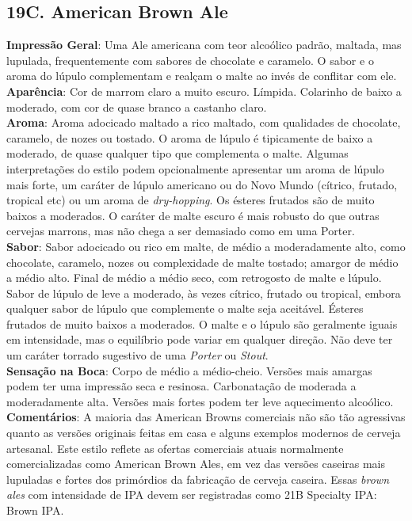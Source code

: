 \subsection*{19C. American Brown Ale}
\textbf{Impressão Geral}: Uma Ale americana com teor alcoólico padrão, maltada, mas lupulada, frequentemente com sabores de chocolate e caramelo. O sabor e o aroma do lúpulo complementam e realçam o malte ao invés de conflitar com ele. \\
\textbf{Aparência}: Cor de marrom claro a muito escuro. Límpida. Colarinho de baixo a moderado, com cor de quase branco a castanho claro. \\
\textbf{Aroma}: Aroma adocicado maltado a rico maltado, com qualidades de chocolate, caramelo, de nozes ou tostado. O aroma de lúpulo é tipicamente de baixo a moderado, de quase qualquer tipo que complementa o malte. Algumas interpretações do estilo podem opcionalmente apresentar um aroma de lúpulo mais forte, um caráter de lúpulo americano ou do Novo Mundo (cítrico, frutado, tropical etc) ou um aroma de \textit{dry-hopping}. Os ésteres frutados são de muito baixos a moderados. O caráter de malte escuro é mais robusto do que outras cervejas marrons, mas não chega a ser demasiado como em uma Porter. \\
\textbf{Sabor}: Sabor adocicado ou rico em malte, de médio a moderadamente alto, como chocolate, caramelo, nozes ou complexidade de malte tostado; amargor de médio a médio alto. Final de médio a médio seco, com retrogosto de malte e lúpulo. Sabor de lúpulo de leve a moderado, às vezes cítrico, frutado ou tropical, embora qualquer sabor de lúpulo que complemente o malte seja aceitável. Ésteres frutados de muito baixos a moderados. O malte e o lúpulo são geralmente iguais em intensidade, mas o equilíbrio pode variar em qualquer direção. Não deve ter um caráter torrado sugestivo de uma \textit{Porter} ou \textit{Stout}. \\
\textbf{Sensação na Boca}: Corpo de médio a médio-cheio. Versões mais amargas podem ter uma impressão seca e resinosa. Carbonatação de moderada a moderadamente alta. Versões mais fortes podem ter leve aquecimento alcoólico. \\
\textbf{Comentários}: A maioria das American Browns comerciais não são tão agressivas quanto as versões originais feitas em casa e alguns exemplos modernos de cerveja artesanal. Este estilo reflete as ofertas comerciais atuais normalmente comercializadas como American Brown Ales, em vez das versões caseiras mais lupuladas e fortes dos primórdios da fabricação de cerveja caseira. Essas \textit{brown ales} com intensidade de IPA devem ser registradas como 21B Specialty IPA: Brown IPA. \\
